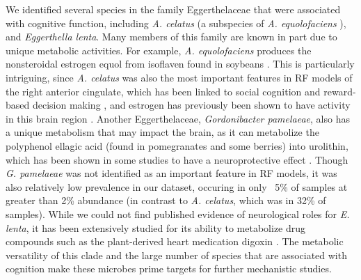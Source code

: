\documentclass{article}
\begin{document}
We identified several species in the family Eggerthelaceae that were
associated with cognitive function, including \emph{A. celatus}
(a subspecies of \emph{A. equolofaciens}
\cite{takahashiCompleteGenomeSequence2021}),
and \emph{Eggerthella lenta}. Many members of this family are
known in part due to unique metabolic activities. For example, \emph{A.
equolofaciens} produces the nonsteroidal estrogen equol from isoflaven
found in soybeans \cite{wangEnantioselectiveSynthesisSEquol2005}.
This is particularly intriguing, since \emph{A. celatus}
was also the most important features in RF models of the
right anterior cingulate, which has been linked to social cognition
and reward-based decision making \cite{appsAnteriorCingulateGyrus2016,boesRightAnteriorCingulate2008,bushDorsalAnteriorCingulate2002},
and estrogen has previously been shown to have activity 
in this brain region \cite{xiaoEstrogenAnteriorCingulate2013}.
Another Eggerthelaceae, \emph{Gordonibacter pamelaeae},
also has a unique metabolism that may impact the brain,
as it can metabolize the polyphenol ellagic acid
(found in pomegranates and some berries) into urolithin, which has been
shown in some studies to have a neuroprotective effect
\cite{gongUrolithinAlleviatesBloodbrain2022,selmaDescriptionUrolithinProduction2014}.
Though \textit{G. pamelaeae} was not identified
as an important feature in RF models,
it was also relatively low prevalence in our dataset,
occuring in only ~5\% of samples at greater than 2\% abundance
(in contrast to \textit{A. celatus}, which was in 32\% of samples).
While we could not find published evidence of neurological roles for \emph{E. lenta},
it has been extensively studied for
its ability to metabolize drug compounds such as the plant-derived heart
medication digoxin \cite{haiserPredictingManipulatingCardiac2013}.
The metabolic versatility of this clade and the large number of
species that are associated with cognition make these microbes prime
targets for further mechanistic studies.
\end{document}
